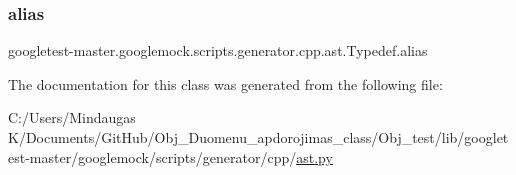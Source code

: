 \subsubsection{\texorpdfstring{alias}{alias}}
{\footnotesize\ttfamily googletest-\/master.\+googlemock.\+scripts.\+generator.\+cpp.\+ast.\+Typedef.\+alias}



The documentation for this class was generated from the following file\+:\begin{DoxyCompactItemize}
\item 
C\+:/\+Users/\+Mindaugas K/\+Documents/\+Git\+Hub/\+Obj\+\_\+\+Duomenu\+\_\+apdorojimas\+\_\+class/\+Obj\+\_\+test/lib/googletest-\/master/googlemock/scripts/generator/cpp/\mbox{\hyperlink{_obj__test_2lib_2googletest-master_2googlemock_2scripts_2generator_2cpp_2ast_8py}{ast.\+py}}\end{DoxyCompactItemize}
